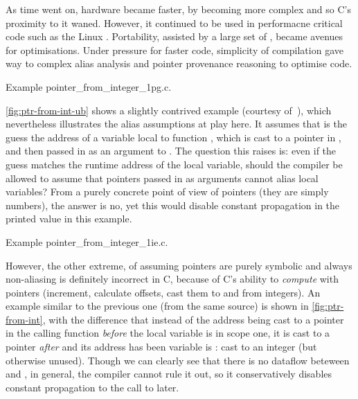As time went on, hardware became faster, by becoming more complex and so C's
proximity to it waned. However, it continued to be used in performacne critical
code such as the Linux . Portability, assisted by a large set of
, became avenues for optimisations. Under pressure for faster code,
simplicity of compilation gave way to complex alias analysis and pointer
provenance reasoning to optimise code.

\begin{marginfigure}
    \centering
    \caption{Example pointer\_from\_integer\_1pg.c.}\label{fig:ptr-from-int-ub}
\end{marginfigure}%

\cref{fig:ptr-from-int-ub} shows a slightly contrived example (courtesy
of~), which nevertheless illustrates the
alias assumptions at play here. It assumes that  is
the guess the address of a variable local to function , which is
cast to a pointer in , and then passed in as an argument to
. The question this raises is: even if the guess matches the runtime
address of the local variable, should the compiler be allowed to assume that
pointers passed in as arguments cannot alias local variables? From a purely
concrete point of view of pointers (they are simply numbers), the answer is no,
yet this would disable constant propagation in the printed value in this
example.

\begin{marginfigure}
    \centering
    \caption{Example pointer\_from\_integer\_1ie.c.}\label{fig:ptr-from-int}
\end{marginfigure}%

However, the other extreme, of assuming pointers are purely symbolic and always
non-aliasing is definitely incorrect in C, because of C's ability to
\emph{compute} with pointers (increment, calculate offsets, cast them to and
from integers). An example similar to the previous one (from the same source)
is shown in \cref{fig:ptr-from-int}, with the difference that instead of the
address being cast to a pointer in the calling function \emph{before} the local
variable is in scope one, it is cast to a pointer \emph{after} and its address
has been variable is : cast to an integer (but otherwise
unused). Though we can clearly see that there is no dataflow beteween
 and , in general, the compiler cannot rule it out, so it
conservatively disables constant propagation to the call to 
later.

